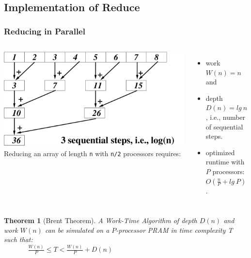 \documentclass{beamer}
\renewcommand{\emph}[1]{\textcolor{structure}{#1}}
\newcommand{\emp}[1]{\textcolor{DikuRed}{ #1}}
\newtheorem{mytheo}{Theorem}
\begin{document}
\subsection{Implementation of Reduce}

\begin{frame}[fragile]
	\tableofcontents[currentsubsection]
\end{frame}


\begin{frame}
  \frametitle{Reducing in Parallel}

\begin{columns}
        \includegraphics[height=22ex]{Figures/L2/ReduceEg.pdf} 
Reducing an array of length {\tt n} with {\tt  n/2} processors requires:
\begin{itemize}
    \item work $W(n) = n$ and 
    \item depth $D(n) = lg \ n$, i.e., number of sequential steps.
    \item optimized runtime with $P$ processors: \emph{$O(\frac{n}{P} + lg \ P)$.}
\end  {itemize}
\end{columns}

\begin{mytheo}[Brent Theorem]\label{BrentTh}
A Work-Time Algorithm of depth $D(n)$ and work $W(n)$ can be
simulated on a $P$-processor PRAM in time complexity T such that:\\\bigskip
\emp{$\ \ \ \ \ \ \ \ \ \ \ \ \ \ \ \ \frac{W(n)}{P} \leq T < \frac{W(n)}{P} + D(n)$}
\end{mytheo}

\end{frame}
\end{document}
